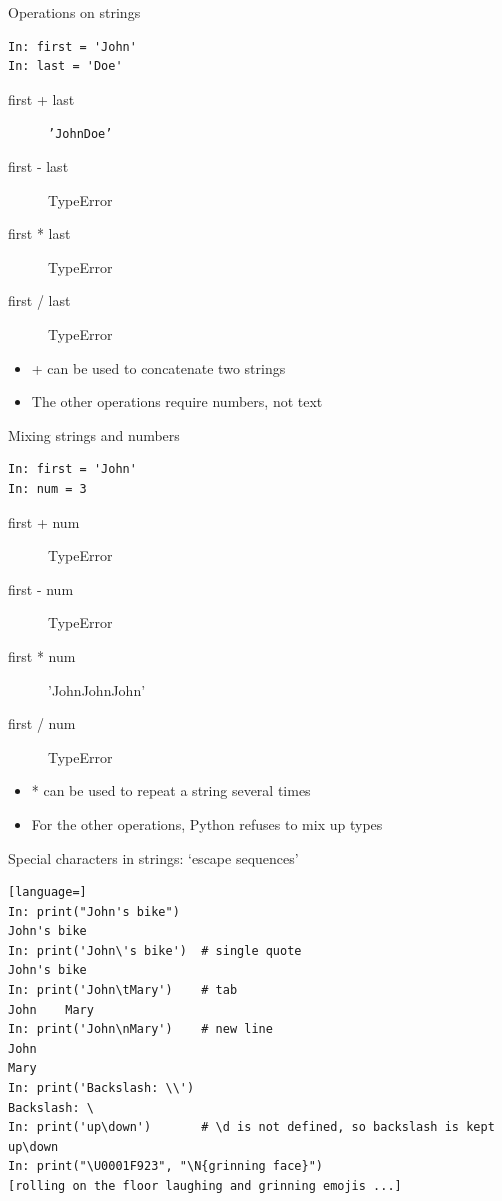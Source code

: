 \documentclass[aspectratio=169,usenames,dvipsnames]{beamer}
\begin{document}
\begin{frame}[fragile]{Operations on strings}
\begin{lstlisting}
In: first = 'John'
In: last = 'Doe'
\end{lstlisting}
\begin{description}
    \item[first + last] \texttt{'JohnDoe'}
    \item[first - last] TypeError
    \item[first * last] TypeError
    \item[first / last] TypeError
\end{description}

\begin{itemize}
\item + can be used to concatenate two strings
\item The other operations require numbers, not text
\end{itemize}
\end{frame}

\begin{frame}[fragile]{Mixing strings and numbers}
\begin{lstlisting}
In: first = 'John'
In: num = 3
\end{lstlisting}
\begin{description}
    \item[first + num] TypeError
    \item[first - num] TypeError
    \item[first * num] 'JohnJohnJohn'
    \item[first / num] TypeError
\end{description}

\begin{itemize}
\item * can be used to repeat a string several times
\item For the other operations, Python refuses to mix up types
\end{itemize}
\end{frame}

\begin{frame}[fragile]{Special characters in strings: `escape sequences'}
\begin{lstlisting}[language=]
In: print("John's bike")
John's bike
In: print('John\'s bike')  # single quote
John's bike
In: print('John\tMary')    # tab
John    Mary
In: print('John\nMary')    # new line
John
Mary
In: print('Backslash: \\')
Backslash: \
In: print('up\down')       # \d is not defined, so backslash is kept
up\down
In: print("\U0001F923", "\N{grinning face}") 
[rolling on the floor laughing and grinning emojis ...]
\end{lstlisting}
\end{frame}
\end{document}
